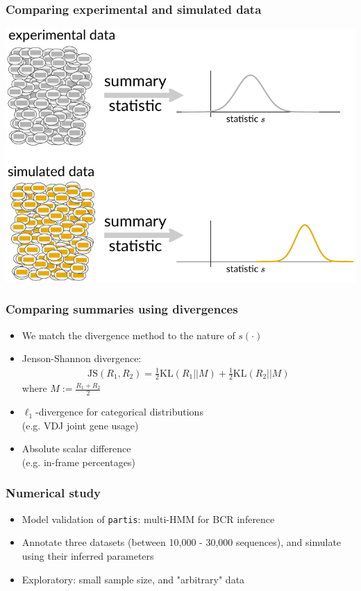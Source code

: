 \documentclass[mathserif,compress]{beamer}
\newcommand*\ba{\[ \begin{aligned}}
\newcommand*\ea{\end{aligned} \]}
\renewcommand\;{\,}
\begin{document}
\begin{frame}\frametitle{Comparing experimental and simulated data}
\begin{center}
\includegraphics[width=\linewidth]{Images/summary-stats.pdf}
\end{center}
\end{frame}

\begin{frame}\frametitle{Comparing summaries using divergences}
\begin{itemize}
\item
We match the divergence method to the nature of $s(\cdot)$
\bigskip
\item
Jenson-Shannon divergence:
\ba
\text{JS}(R_1, R_2) = \frac{1}{2} \text{KL}(R_1 || M) + \frac{1}{2} \text{KL}(R_2 || M)
\ea
where $M := \frac{R_1 + R_2}{2}$

\bigskip
\item
$\ell_1$-divergence for categorical distributions
\\ \vspace{0.5em}
(e.g. VDJ joint gene usage)
\bigskip
\item
Absolute scalar difference \\
(e.g. in-frame percentages)
\end{itemize}
\end{frame}

\begin{frame}\frametitle{Numerical study}
\begin{itemize}
\item
Model validation of \texttt{partis}: multi-HMM for BCR inference
\bigskip
\item
Annotate three datasets (between 10,000 - 30,000 sequences), and simulate using their inferred parameters
\bigskip
\item
Exploratory: small sample size, and "arbitrary" data
\end{itemize}
\end{frame}
\end{document}
